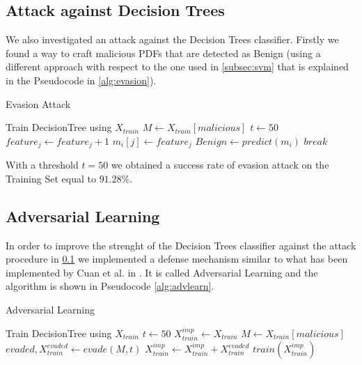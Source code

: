 \documentclass[twocolumn, switch]{article} %
\begin{document}
\subsection{Attack against Decision Trees}
\label{subsec:tree}
We also investigated an attack against the Decision Trees classifier. Firstly we found a way to craft malicious PDFs that are detected as Benign (using a different approach with respect to the one used in \ref{subsec:svm} that is explained in the Pseudocode in \ref{alg:evasion}).
\begin{algorithm}
	{\footnotesize
		\caption{Evasion Attack}\label{alg:evasion}
		\begin{algorithmic}
			\Require Train DecisionTree using $X_{train}$
			\State $M \gets X_{train}[malicious]$
			\State $t \gets 50$
			\State $feature_j \gets feature_j + 1$
			\State $m_i[j] \gets feature_j$
			\State $Benign \gets predict(m_i)$
			\State $break$  
			\EndIf
			\EndWhile
			\EndFor
			\EndFor
		\end{algorithmic}
	}
\end{algorithm}

With a threshold $t=50$ we obtained a success rate of evasion attack on the Training Set equal to $91.28\%$.

\subsection{Adversarial Learning}
In order to improve the strenght of the Decision Trees classifier against the attack procedure in \ref{subsec:tree} we implemented a defense mechanism similar to what has been implemented by Cuan et al. in \cite{cuan_damien_delaplace_valois_2018}.
It is called Adversarial Learning and the algorithm is shown in Pseudocode \ref{alg:advlearn}.

\begin{algorithm}
	{\footnotesize
		\caption{Adversarial Learning}\label{alg:advlearn}
		\begin{algorithmic}
			\Require Train DecisionTree using $X_{train}$
			\State $t \gets 50$
			\State $X_{train}^{imp} \gets X_{train}$
			\State $M \gets X_{train}[malicious]$
			\While{$\#PDF evaded > 0$}
			\State $evaded,X_{train}^{evaded} \gets evade(M,t)$
			\If{$evaded$ is $True$}
			\State $X_{train}^{imp} \gets X_{train}^{imp} + X_{train}^{evaded}$
			\EndIf
			\State $train(X_{train}^{imp})$
			\EndWhile
		\end{algorithmic}
	}
\end{algorithm}
\end{document}
